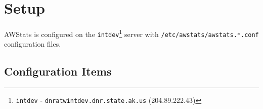 
\newpage
\section{Setup}
AWStats is configured on the \texttt{intdev}\footnote{\texttt{intdev} - 
\texttt{dnratwintdev.dnr.state.ak.us} (204.89.222.43)} server
with \texttt{/etc/awstats/awstats.*.conf} configuration files.


\subsection{Configuration Items}


\begin{center}
\begin{table}[htbp]
\end{table}
\end{center}





